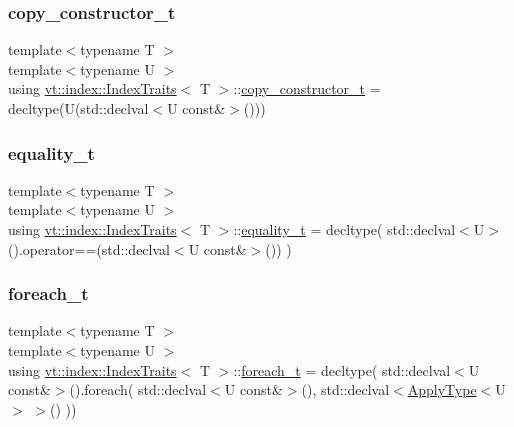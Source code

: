 \subsubsection{\texorpdfstring{copy\+\_\+constructor\+\_\+t}{copy\_constructor\_t}}
{\footnotesize\ttfamily template$<$typename T $>$ \\
template$<$typename U $>$ \\
using \hyperlink{structvt_1_1index_1_1_index_traits}{vt\+::index\+::\+Index\+Traits}$<$ T $>$\+::\hyperlink{structvt_1_1index_1_1_index_traits_ad99299628a662db3cfa5021b810e8846}{copy\+\_\+constructor\+\_\+t} =  decltype(U(std\+::declval$<$U const\&$>$()))}

\mbox{\label{structvt_1_1index_1_1_index_traits_a87c63bbffab452de516eb2dbc93c07e3}} 
\subsubsection{\texorpdfstring{equality\+\_\+t}{equality\_t}}
{\footnotesize\ttfamily template$<$typename T $>$ \\
template$<$typename U $>$ \\
using \hyperlink{structvt_1_1index_1_1_index_traits}{vt\+::index\+::\+Index\+Traits}$<$ T $>$\+::\hyperlink{structvt_1_1index_1_1_index_traits_a87c63bbffab452de516eb2dbc93c07e3}{equality\+\_\+t} =  decltype( std\+::declval$<$U$>$().operator==(std\+::declval$<$U const\&$>$()) )}

\mbox{\label{structvt_1_1index_1_1_index_traits_a132ed4a131bbc5f9e410e203cf2e08ae}} 
\subsubsection{\texorpdfstring{foreach\+\_\+t}{foreach\_t}}
{\footnotesize\ttfamily template$<$typename T $>$ \\
template$<$typename U $>$ \\
using \hyperlink{structvt_1_1index_1_1_index_traits}{vt\+::index\+::\+Index\+Traits}$<$ T $>$\+::\hyperlink{structvt_1_1index_1_1_index_traits_a132ed4a131bbc5f9e410e203cf2e08ae}{foreach\+\_\+t} =  decltype( std\+::declval$<$U const\&$>$().foreach( std\+::declval$<$U const\&$>$(), std\+::declval$<$\hyperlink{structvt_1_1index_1_1_index_traits_ab13467c0c40bb0f17103d108cd08437f}{Apply\+Type}$<$U$>$ $>$() ))}

